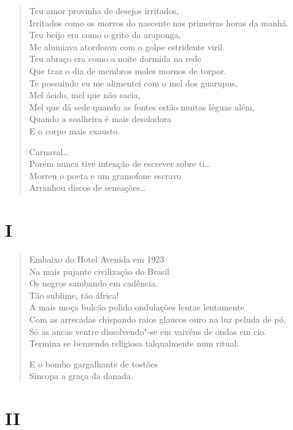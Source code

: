 {\begin{verse}
Teu amor provinha de desejos irritados,\\
Irritados como os morros do nascente nas primeiras horas da manhã.\\
Teu beijo era como o grito da araponga,\\
Me alumiava atordoava com o golpe estridente viril.\\
Teu abraço era como a noite dormida na rede\\
Que traz o dia de membros moles mornos de torpor.\\
Te possuindo eu me alimentei com o mel dos guarupus,\\
Mel ácido, mel que não sacia,\\
Mel que dá sede quando as fontes estão muitas léguas além,\\
Quando a soalheira é mais desoladora\\
E o corpo mais exausto.

Carnaval\ldots{}\\
Porém nunca tive intenção de escrever sobre ti\ldots{}\\
Morreu o poeta e um gramofone escravo\\
Arranhou discos de sensações\ldots{}
\end{verse}

\medskip
\section*{I}

\begin{verse}
Embaixo do Hotel Avenida em 1923\\
Na mais pujante civilização do Brasil\\
Os negros sambando em cadência.\\
Tão sublime, tão áfrica!\\
A mais moça bulcão polido ondulações lentas lentamente\\
Com as arrecadas chispando raios glaucos ouro na luz peluda de pó.\\
Só as ancas ventre dissolvendo"-se em vaivéns de ondas em cio.\\
Termina se benzendo religiosa talqualmente num ritual.

E o bombo gargalhante de tostões\\
Sincopa a graça da danada.
\end{verse}

\medskip
\section*{II}

}
